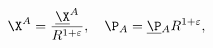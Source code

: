 \begin{equation}
\X^A=\frac{\underline{\X}^A}{R^{1+\varepsilon}},
\quad
\P_A=\underline{\P}{}_AR^{1+\varepsilon},
\label{trick}
\end{equation}

